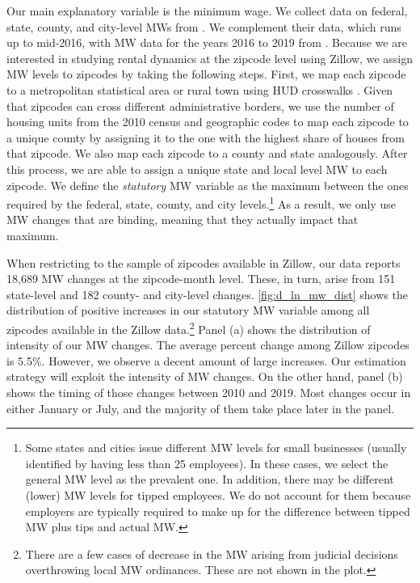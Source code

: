 Our main explanatory variable is the minimum wage. We collect data on federal, state, 
county, and city-level MWs from \textcite{VaghulZipperer2016}. We complement their data,
which runs up to mid-2016, with MW data for the years 2016 to 2019 from 
\textcite{BerkeleyLaborCenter}. Because we are interested in studying rental dynamics at 
the zipcode level using Zillow, we assign MW levels to zipcodes by taking the following steps.
First, we map each zipcode to a metropolitan statistical area or rural town using HUD 
crosswalks \parencite{hudCrosswalks}. Given that zipcodes can cross different administrative
borders, we use the number of housing units from the 2010 census and geographic codes to map 
each zipcode to a unique county by assigning it to the one with the highest share of houses 
from that zipcode. We also map each zipcode to a county and state analogously. After this 
process, we are able to assign a unique state and local level MW to each zipcode. We define 
the \textit{statutory} MW variable as the maximum between the ones required by the federal, 
state, county, and city levels.\footnote{Some states and cities issue different MW levels 
	for small businesses (usually identified by having less than 25 employees). In these 
	cases, we select the general MW level as the prevalent one. In addition, there may be 
	different (lower) MW levels for tipped employees. We do not account for them because 
	employers are typically required to make up for the difference between tipped MW plus 
	tips and actual MW.}
As a result, we only use MW changes that are binding, meaning that they actually impact 
that maximum. 

When restricting to the sample of zipcodes available in Zillow, our data reports 18,689 
MW changes at the zipcode-month level. These, in turn, arise from 151 state-level and 182 
county- and city-level changes. \autoref{fig:d_ln_mw_dist} shows the distribution of 
positive increases in our statutory MW variable among all zipcodes available in the 
Zillow data.\footnote{There are a few cases of decrease in the MW arising from judicial 
decisions overthrowing local MW ordinances. These are not shown in the plot.}
Panel (a) shows the distribution of intensity of our MW changes. The average percent 
change among Zillow zipcodes is 5.5\%. %
However, we observe a decent amount of large increases. Our estimation strategy will
exploit the intensity of MW changes. On the other hand, panel (b) shows the timing of 
those changes between 2010 and 2019. Most changes occur in either January or July, 
and the majority of them take place later in the panel.

